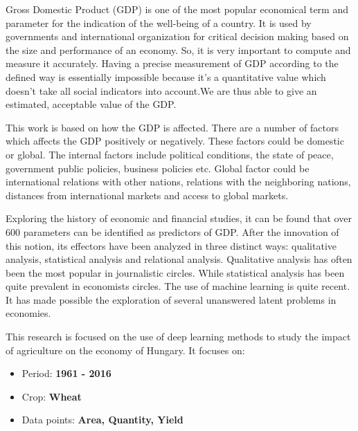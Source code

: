 \documentclass[
]{thesis-ekf}
\begin{document}

Gross Domestic Product (GDP) is one of the most popular economical term and parameter for the indication of the well-being of a country. It is used by governments and international organization for critical decision making based on the size and performance of an economy. So, it is very important to compute and measure it accurately. Having a precise measurement of GDP according to the defined way is essentially impossible because it's a quantitative value which doesn't take all social indicators into account.We are thus able to give an estimated, acceptable value of the GDP.

This work is based on how the GDP is affected. There are a number of factors which affects the GDP positively or negatively. These factors could be domestic or global. The internal factors include political conditions, the state of peace, government public policies, business policies etc. Global factor could be international relations with other nations, relations with the neighboring nations, distances from international markets and access to global markets. 


Exploring the history of economic and financial studies, it can be found that over 600 parameters can be identified \cite{richardson2020nowcasting} as predictors of GDP. After the innovation of this notion, its effectors have been analyzed in three distinct ways: qualitative analysis, statistical analysis and relational analysis. Qualitative analysis has often been the most popular in journalistic circles. While statistical analysis has been quite prevalent in economists circles. The use of machine learning is quite recent. It has made possible the exploration of several unanswered latent problems in economies.\cite{richardson2020nowcasting, milavcic2017application, kumar2019novel}


This research is focused on the use of deep learning methods to study the impact of agriculture on the economy of Hungary. It focuses on:

\begin{itemize}
	\item Period: \textbf{1961 - 2016}
	\item Crop: \textbf{Wheat}
	\item Data points: \textbf{Area, Quantity, Yield}
\end{itemize}
\end{document}
